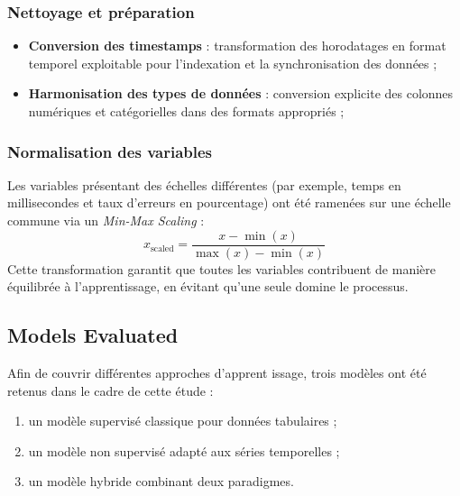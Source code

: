\documentclass[conference]{IEEEtran}
\begin{document}
\subsubsection{Nettoyage et préparation}
\begin{itemize}
    \item \textbf{Conversion des timestamps} : transformation des horodatages en format temporel exploitable pour l’indexation et la synchronisation des données ;
    \item \textbf{Harmonisation des types de données} : conversion explicite des colonnes numériques et catégorielles dans des formats appropriés ;
\end{itemize}

\subsubsection{Normalisation des variables}
Les variables présentant des échelles différentes (par exemple, temps en millisecondes et taux d’erreurs en pourcentage) ont été ramenées sur une échelle commune via un \textit{Min-Max Scaling} :
\[
x_{\text{scaled}} = \frac{x - \min(x)}{\max(x) - \min(x)}
\]
Cette transformation garantit que toutes les variables contribuent de manière équilibrée à l’apprentissage, en évitant qu’une seule domine le processus.

\subsection{Models Evaluated}

Afin de couvrir différentes approches d’apprent issage, trois modèles ont été retenus dans le cadre de cette étude :  
\begin{enumerate}
    \item un modèle supervisé classique pour données tabulaires ;
    \item un modèle non supervisé adapté aux séries temporelles ;
    \item un modèle hybride combinant deux paradigmes.
\end{enumerate}
\end{document}
